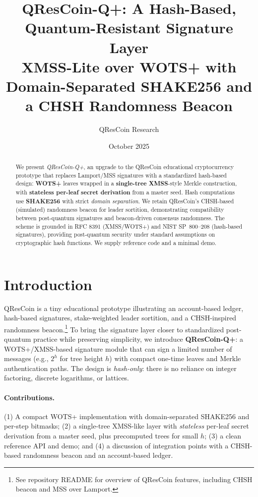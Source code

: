 \documentclass[11pt]{article}
\title{QResCoin-Q+: A Hash-Based, Quantum-Resistant Signature Layer\\
\large XMSS-Lite over WOTS+ with Domain-Separated SHAKE256 and a CHSH Randomness Beacon}
\author{QResCoin Research}
\date{October 2025}
\begin{document}
\maketitle

\begin{abstract}
We present \emph{QResCoin-Q+}, an upgrade to the QResCoin educational cryptocurrency prototype that replaces Lamport/MSS signatures with a standardized hash-based design: \textbf{WOTS+} leaves wrapped in a \textbf{single-tree XMSS}-style Merkle construction, with \textbf{stateless per-leaf secret derivation} from a master seed. Hash computations use \textbf{SHAKE256} with strict \emph{domain separation}. We retain QResCoin's CHSH-based (simulated) randomness beacon for leader sortition, demonstrating compatibility between post-quantum signatures and beacon-driven consensus randomness. The scheme is grounded in RFC 8391 (XMSS/WOTS+) and NIST SP~800--208 (hash-based signatures), providing post-quantum security under standard assumptions on cryptographic hash functions. We supply reference code and a minimal demo.
\end{abstract}

\section{Introduction}
QResCoin is a tiny educational prototype illustrating an account-based ledger, hash-based signatures, stake-weighted leader sortition, and a CHSH-inspired randomness beacon.\footnote{See repository README for overview of QResCoin features, including CHSH beacon and MSS over Lamport.} To bring the signature layer closer to standardized post-quantum practice while preserving simplicity, we introduce \textbf{QResCoin-Q+}: a WOTS+/XMSS-based signature module that can sign a limited number of messages (e.g., $2^h$ for tree height $h$) with compact one-time leaves and Merkle authentication paths. The design is \emph{hash-only}: there is no reliance on integer factoring, discrete logarithms, or lattices.

\paragraph{Contributions.} (1) A compact WOTS+ implementation with domain-separated SHAKE256 and per-step bitmasks; (2) a single-tree XMSS-like layer with \emph{stateless} per-leaf secret derivation from a master seed, plus precomputed trees for small $h$; (3) a clean reference API and demo; and (4) a discussion of integration points with a CHSH-based randomness beacon and an account-based ledger.
\end{document}
